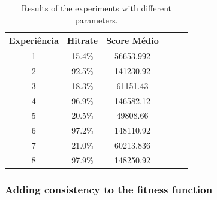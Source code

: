 \documentclass[a4paper, 12pt, fleqn]{report}
\begin{document}
    \begin{table}[H]
        \centering
        \begin{tabular}{|c|c|c|c|c|c|}
        \hline
        \textbf{Experiência} & \textbf{Hitrate} & \textbf{Score Médio} \\
        \hline
                    1 & 15.4\% & 56653.992  \\
        \hline
                    2 & 92.5\% & 141230.92  \\
        \hline
                    3 & 18.3\% & 61151.43  \\
        \hline
                    4 & 96.9\% & 146582.12 \\
        \hline
                    5 & 20.5\% & 49808.66  \\
        \hline
                    6 & 97.2\% & 148110.92 \\
        \hline
                    7 & 21.0\%  & 60213.836 \\
        \hline
                    8 & 97.9\% & 148250.92 \\
        \hline
        \end{tabular}
        \caption{Results of the experiments with different parameters.}
        \label{tab:experiments}
    \end{table}



\subsubsection{Adding consistency to the fitness function}
\end{document}
